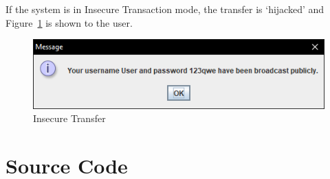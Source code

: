 \documentclass[12pt,twocolumn]{IEEEtran}
\begin{document}
If the system is in Insecure Transaction mode, the transfer is `hijacked' and Figure~\ref{fig:insecure} is shown to the user.

\begin{figure}[h!]
	\centering
	\includegraphics[width=0.4\linewidth]{./Resources/successInsecure.PNG}
	\caption{Insecure Transfer} \label{fig:insecure}
\end{figure}


\clearpage
\section{Source Code} \label{app:code}
\setcounter{figure}{0}  
\setcounter{equation}{0} 
\setcounter{table}{0}




















	
\end{document}
